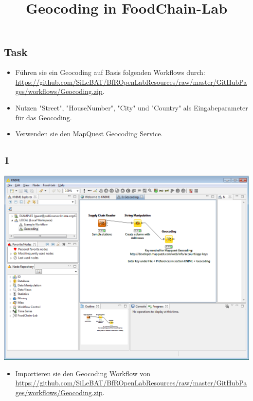 \documentclass{beamer}
\title{Geocoding in FoodChain-Lab}
\date{}
\begin{document}
\maketitle

\section{ }

\subsection{Task}
\begin{frame}
	\begin{itemize}
		\item Führen sie ein Geocoding auf Basis folgenden Workflows durch: \url{https://github.com/SiLeBAT/BfROpenLabResources/raw/master/GitHubPages/workflows/Geocoding.zip}.
		\item Nutzen "Street", "HouseNumber", "City" und "Country" als Eingabeparameter für das Geocoding.
		\item Verwenden sie den MapQuest Geocoding Service.
	\end{itemize}
\end{frame}
 
\subsection{1}
\begin{frame}
	\begin{center}
  		\includegraphics[height=0.6\textheight]{1.png}
	\end{center}
	\begin{itemize}
		\item Importieren sie den Geocoding Workflow von \url{https://github.com/SiLeBAT/BfROpenLabResources/raw/master/GitHubPages/workflows/Geocoding.zip}.
	\end{itemize}
\end{frame}
\end{document}
